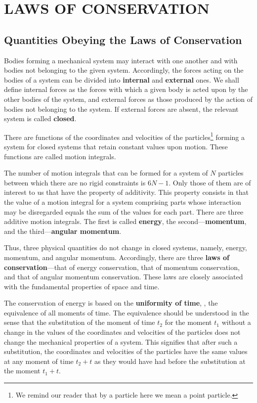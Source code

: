 

\chapter{LAWS OF CONSERVATION}\label{chap:3}

\section{Quantities Obeying the Laws of Conservation}\label{sec:3_1}

Bodies forming a mechanical system may interact with one another and with bodies not belonging to the given system. Accordingly, the forces acting on the bodies of a system can be divided into \textbf{internal} and \textbf{external} ones. We shall define internal forces as the forces with which a given body is acted upon by the other bodies of the system, and external forces as those produced by the action of bodies not belonging to the system. If external forces are absent, the relevant system is called \textbf{closed}.

There are functions of the coordinates and velocities of the particles\footnote{We remind our reader that by a particle here we mean a point particle.} forming a system for closed systems that retain constant values upon motion. These functions are called motion integrals.

The number of motion integrals that can be formed for a system of $N$ particles between which there are no rigid constraints is $6N-1$. Only those of them are of interest to us that have the property of additivity. This property consists in that the value of a motion integral for a system comprising parts whose interaction may be disregarded equals the sum of the values for each part. There are three additive motion integrals. The first is called \textbf{energy}, the second---\textbf{momentum}, and the third---\textbf{angular momentum}.

Thus, three physical quantities do not change in closed systems, namely, energy, momentum, and angular momentum. Accordingly, there are three \textbf{laws of conservation}---that of energy conservation, that of momentum conservation, and that of angular momentum conservation. These laws are closely associated with the fundamental properties of space and time.

The conservation of energy is based on the \textbf{uniformity of time}, \ie, the equivalence of all moments of time. The equivalence should be understood in the sense that the substitution of the moment of time $t_2$ for the moment $t_1$ without a change in the values of the coordinates and velocities of the particles does not change the mechanical properties of a system. This signifies that after such a substitution, the coordinates and velocities of the particles have the same values at any moment of time $t_2+t$ as they would have had before the substitution at the moment $t_1+t$.

